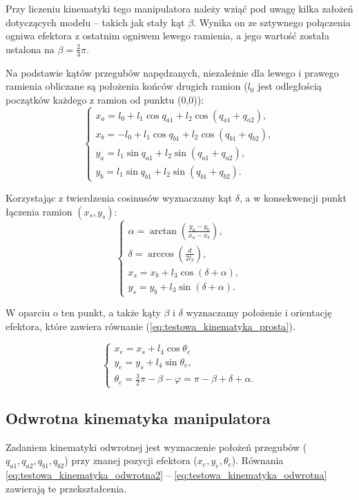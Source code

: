 \documentclass[printmode]{mgr}
\begin{document}
Przy liczeniu kinematyki tego manipulatora należy wziąć pod uwagę kilka założeń dotyczących modelu -- takich jak stały kąt $\beta$.
Wynika on ze sztywnego połączenia ogniwa efektora z ostatnim ogniwem lewego ramienia, a jego wartość została ustalona na $\beta = \frac{2}{3}\pi$.

Na podstawie kątów przegubów napędzanych, niezależnie dla lewego i prawego ramienia obliczane są położenia końców drugich ramion
($l_0$ jest odległością początków każdego z ramion od punktu (0,0)):
\begin{equation}
\begin{cases}
x_a = l_0 + l_1\cos q_{a1} + l_2 \cos(q_{a1}+q_{a2}),\\
x_b = -l_0 + l_1\cos q_{b1} + l_2 \cos(q_{b1}+q_{b2}),\\
y_a = l_1\sin q_{a1} + l_2 \sin(q_{a1}+q_{a2}),\\
y_b = l_1\sin q_{b1} + l_2 \sin(q_{b1}+q_{b2}).
\end{cases}
\label{eq:testowa_kinematyka_prosta2}
\end{equation}

Korzystając z twierdzenia cosinusów wyznaczamy kąt $\delta$, a w konsekwencji punkt łączenia ramion $(x_s, y_s)$:
\begin{equation}
\begin{cases}
\alpha = \arctan(\frac{y_a-y_b}{x_a-x_b}),\\
\delta = \arccos(\frac{d}{2l_3}),\\
x_s = x_b + l_3\cos(\delta + \alpha),\\
y_s = y_b + l_3\sin(\delta + \alpha).
\end{cases}
\label{eq:testowa_kinematyka_prosta3}
\end{equation}

W oparciu o ten punkt, a także kąty $\beta$ i $\delta$ wyznaczamy położenie i orientację efektora, które zawiera
równanie (\ref{eq:testowa_kinematyka_prosta}).

\begin{equation}
\begin{cases}
x_e = x_s + l_4\cos\theta_e\\
y_e = y_s + l_4\sin\theta_e,\\
\theta_e = \frac{3}{2}\pi - \beta - \varphi = \pi - \beta + \delta + \alpha.
\end{cases}
\label{eq:testowa_kinematyka_prosta}
\end{equation}

\subsection{Odwrotna kinematyka manipulatora}
Zadaniem kinematyki odwrotnej jest wyznaczenie położeń przegubów ($q_{a1}, q_{a2}, q_{b1}, q_{b2}$) przy znanej pozycji efektora
($x_e, y_e, \theta_e$). Równania \ref{eq:testowa_kinematyka_odwrotna2} -- \ref{eq:testowa_kinematyka_odwrotna} zawierają te przekształcenia.
\end{document}
